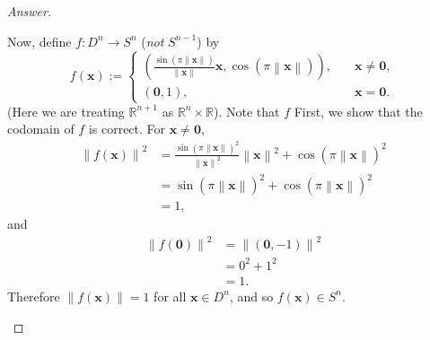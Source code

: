 \documentclass[12pt]{article}
\newcommand{\real}{\mathbb{R}}
\newcommand{\ita}[1]{\textit{#1}}
\newcommand\paren[1]{\left( #1 \right)}
\newcommand{\norm}[1]{\left \| #1 \right \|}
\theoremstyle{definition}
\begin{document}
\begin{proof}[Answer]
\begin{enumerate}[(a)]
        Now, define $f : D^n \to S^n$ (\ita{not} $S^{n-1}$) by 
        \[
            f \paren{ \mathbf{x} } := \begin{cases}
                \paren{ \frac{ \sin \paren{ \pi \norm { \mathbf{x} } } }{\norm{\mathbf{x}}} \mathbf{x} , \cos \paren{ \pi \norm{ \mathbf{x} } } } , & \quad \mathbf{x} \neq \mathbf{0}, \\
                (\mathbf{0},1) , & \quad \mathbf{x} = \mathbf{0}.
            \end{cases}
        \]
        (Here we are treating $\real^{n+1}$ as $\real^n \times \real$). Note that $f$ 
        First, we show that the codomain of $f$ is correct. For $\mathbf{x} \neq \mathbf{0}$, 
        \begin{align*}
            \norm{ f \paren{ \mathbf{x} } }^2 & = \frac{ \sin \paren{ \pi \norm { \mathbf{x} } }^2 }{\norm{\mathbf{x}}^2} \norm{\mathbf{x}}^2 + \cos \paren{ \pi \norm{ \mathbf{x} } }^2 \\
            & = \sin \paren{ \pi \norm{ \mathbf{x} } }^2 + \cos \paren{ \pi \norm{ \mathbf{x} } }^2 \\
            & = 1,
        \end{align*}
        and 
        \begin{align*}
            \norm{ f \paren{ \mathbf{0} } }^2 & = \norm{ \paren{ \mathbf{0} , -1 } }^2 \\
            & = 0^2 + 1^2 \\
            & = 1.
        \end{align*}
        Therefore $\norm{ f \paren{ \mathbf{x} } } = 1$ for all $\mathbf{x} \in D^n$, and so $f \paren{ \mathbf{x} } \in S^n$. 
        

\end{enumerate}
\end{proof}
\end{document}
